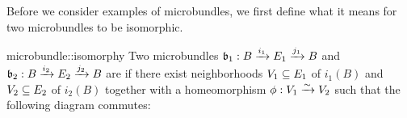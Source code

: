 \begin{myparagraph}
    Before we consider examples of microbundles, we first define
    what it means for two microbundles to be isomorphic.
\end{myparagraph}

\begin{mydefinition}[isomorphy]{microbundle::isomorphy}
    Two microbundles $\bundledef{\bb_1}{B}{E_1}{i_1}{j_1}$ and $\bundledef{\bb_2}{B}{E_2}{i_2}{j_2}$
    are  if there exist neighborhoods $V_1 \sub E_1$ of $i_1(B)$ and $V_2 \sub E_2$ of $i_2(B)$
    together with a homeomorphism $\phi: V_1 \isomto V_2$
    such that the following diagram commutes: 
    \begin{center}
    \end{center}
\end{mydefinition}